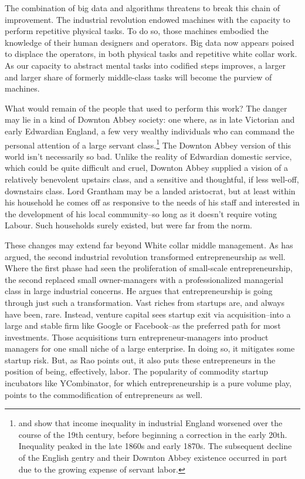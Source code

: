 \documentclass[12pt]{article}
\begin{document}
The combination of big data and algorithms threatens to break this
chain of improvement. The industrial revolution endowed machines with
the capacity to perform repetitive physical tasks. To do so, those
machines embodied the knowledge of their human designers and
operators. Big data now appears poised to displace the operators, in
both physical tasks and repetitive white collar work. As our capacity
to abstract mental tasks into codified steps improves, a larger and
larger share of formerly middle-class tasks will become the purview of
machines. 

What would remain of the people that used to perform this work? The
danger may lie in a kind of Downton Abbey society: one where, as in
late Victorian and early Edwardian England, a few very
wealthy individuals who can command the personal attention of a large
servant class.\footnote{\cite{lindert1983reinterpreting} and \cite{lindert2000three} show that
  income inequality in industrial England worsened over the course of
  the 19th century, before beginning a correction in the early
  20th. Inequality peaked in the late 1860s and early 1870s. The
  subsequent decline of the English gentry and their Downton Abbey
  existence occurred in part due to the growing expense of servant
  labor.} The Downton Abbey version of this world isn't
necessarily so bad. Unlike the reality of Edwardian domestic service,
which could be quite difficult and cruel, Downton Abbey supplied a
vision of a relatively benevolent upstairs class, and a sensitive and
thoughtful, if less well-off, downstairs class. Lord Grantham may be
a landed aristocrat, but at least within his household he comes off as
responsive to the needs of his staff and interested in the development
of his local community--so long as it doesn't require voting
Labour. Such households surely existed, but were far from the norm.

These changes may extend far beyond White collar middle management. As
\cite{rao2012} has argued, the second industrial revolution
transformed entrepreneurship as well. Where the first phase had seen
the proliferation of small-scale entrepreneurship, the second
replaced small owner-managers with a professionalized managerial class
in large industrial concerns. He argues that entrepreneurship is going through just such a
transformation. Vast riches from startups are, and always have been,
rare. Instead, venture capital sees startup exit via acquisition--into
a large and stable firm like Google or Facebook--as the preferred path
for most investments. Those acquisitions turn entrepreneur-managers
into product managers for one small niche of a large enterprise. In
doing so, it mitigates some startup
risk. But, as Rao points out, it also puts these entrepreneurs in the
position of being, effectively, labor. The popularity of commodity startup
incubators like YCombinator, for which entrepreneurship is a pure
volume play, points to the commodification of entrepreneurs as
well. 
\end{document}
